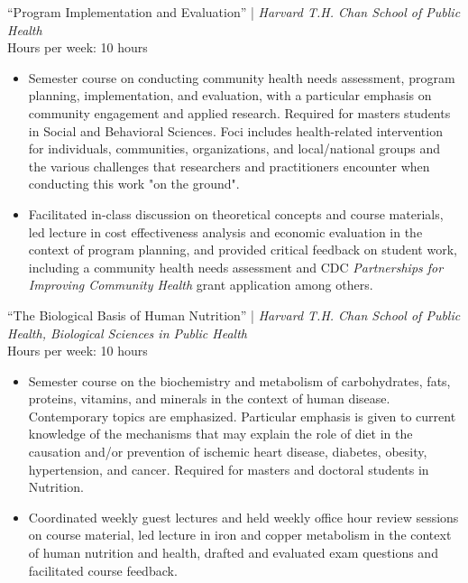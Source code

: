 \documentclass{cv_style}
\begin{document}
``Program Implementation and Evaluation'' | \textit{Harvard T.H. Chan School of Public Health}\\
Hours per week: 10 hours
\begin{itemize}
  \vspace{0em} \item Semester course on conducting community health needs assessment, program planning, implementation, and evaluation, with a particular emphasis on community engagement and applied research. Required for masters students in Social and Behavioral Sciences. Foci includes health-related intervention for individuals, communities, organizations, and local/national groups and the various challenges that researchers and practitioners encounter when conducting this work "on the ground". 
  \item \parskip 1pt Facilitated in-class discussion on theoretical concepts and course materials, led lecture in cost effectiveness analysis and economic evaluation in the context of program planning, and provided critical feedback on student work, including a community health needs assessment and CDC \textit{Partnerships for Improving Community Health} grant application among others. 
\end{itemize}

``The Biological Basis of Human Nutrition'' | \textit{Harvard T.H. Chan School of Public Health, Biological Sciences in Public Health}\\
Hours per week: 10 hours
\begin{itemize}
  \vspace{0em} \item Semester course on the biochemistry and metabolism of carbohydrates, fats, proteins, vitamins, and minerals in the context of human disease. Contemporary topics are emphasized. Particular emphasis is given to current knowledge of the mechanisms that may explain the role of diet in the causation and/or prevention of ischemic heart disease, diabetes, obesity, hypertension, and cancer. Required for masters and doctoral students in Nutrition.
  \item \parskip 1pt Coordinated weekly guest lectures and held weekly office hour review sessions on course material, led lecture in iron and copper metabolism in the context of human nutrition and health, drafted and evaluated exam questions and facilitated course feedback.
\end{itemize}
\end{document}

